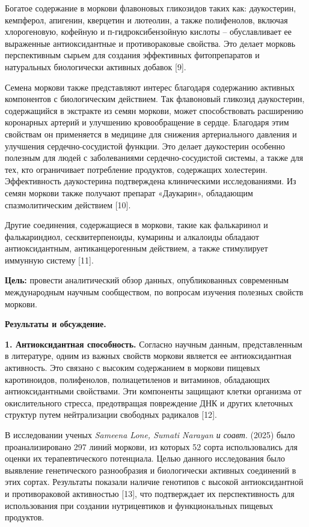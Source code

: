 \begin{multicols}{2}
Богатое содержание в моркови флавоновых гликозидов таких как:
даукостерин, кемпферол, апигенин, кверцетин и лютеолин, а также
полифенолов, включая хлорогеновую, кофейную и п-гидроксибензойную
кислоты -- обуславливает ее выраженные антиоксидантные и противораковые
свойства. Это делает морковь перспективным сырьем для создания
эффективных фитопрепаратов и натуральных биологически активных добавок
{[}9{]}.

Семена моркови также представляют интерес благодаря содержанию активных
компонентов с биологическим действием. Так флавоновый гликозид
даукостерин, содержащийся в экстракте из семян моркови, может
способствовать расширению коронарных артерий и улучшению кровообращение
в сердце. Благодаря этим свойствам он применяется в медицине для
снижения артериального давления и улучшения сердечно-сосудистой функции.
Это делает даукостерин особенно полезным для людей с заболеваниями
сердечно-сосудистой системы, а также для тех, кто ограничивает
потребление продуктов, содержащих холестерин. Эффективность даукостерина
подтверждена клиническими исследованиями. Из семян моркови также
получают препарат «Даукарин», обладающим спазмолитическим действием
{[}10{]}.

Другие соединения, содержащиеся в моркови, такие как фалькаринол и
фалькариндиол, сесквитерпеноиды, кумарины и алкалоиды обладают
антиоксидантным, антиканцерогенным действием, а также стимулирует
иммунную систему {[}11{]}.

{\bfseries Цель:} провести аналитический обзор данных, опубликованных
современным международным научным сообществом, по вопросам изучения
полезных свойств моркови.

{\bfseries Результаты и обсуждение.}

{\bfseries 1. Антиоксидантная способность.} Согласно научным данным,
представленным в литературе, одним из важных свойств моркови является ее
антиоксидантная активность. Это связано с высоким содержанием в моркови
пищевых каротиноидов, полифенолов, полиацетиленов и витаминов,
обладающих антиоксидантными свойствами. Эти компоненты защищают клетки
организма от окислительного стресса, предотвращая повреждение ДНК и
других клеточных структур путем нейтрализации свободных радикалов
{[}12{]}.

В исследовании ученых \emph{Sameena Lone, Sumati Narayan и соавт}.
(2025) было проанализировано 297 линий моркови, из которых 52 сорта
использовались для оценки их терапевтического потенциала. Целью данного
исследования было выявление генетического разнообразия и биологически
активных соединений в этих сортах. Результаты показали наличие генотипов
с высокой антиоксидантной и противораковой активностью {[}13{]}, что
подтверждает их перспективность для использования при создании
нутрицевтиков и функциональных пищевых продуктов.


\end{multicols}
